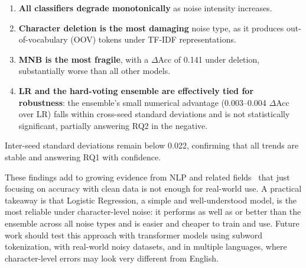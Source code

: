 \documentclass[sigconf]{acmart}
\begin{document}
\begin{enumerate}
  \item \textbf{All classifiers degrade monotonically} as noise intensity
    increases.
  \item \textbf{Character deletion is the most damaging} noise type, as it
    produces out-of-vocabulary (OOV) tokens under TF-IDF representations.
  \item \textbf{MNB is the most fragile}, with a $\Delta$Acc of 0.141 under
    deletion, substantially worse than all other models.
  \item \textbf{LR and the hard-voting ensemble are effectively tied for
    robustness}: the ensemble's small numerical advantage (0.003--0.004
    $\Delta$Acc over LR) falls within cross-seed standard deviations and is not
    statistically significant, partially answering RQ2 in the negative.
\end{enumerate}

Inter-seed standard deviations remain below 0.022, confirming that all trends
are stable and answering RQ1 with confidence.

These findings add to growing evidence from NLP and related
fields~\cite{tumula2024} that just focusing on accuracy with clean data is not
enough for real-world use. A practical takeaway is that Logistic Regression, a
simple and well-understood model, is the most reliable under character-level
noise: it performs as well as or better than the ensemble across all noise
types and is easier and cheaper to train and use. Future work should test this
approach with transformer models using subword tokenization, with real-world
noisy datasets, and in multiple languages, where character-level errors may
look very different from English.




\end{document}
